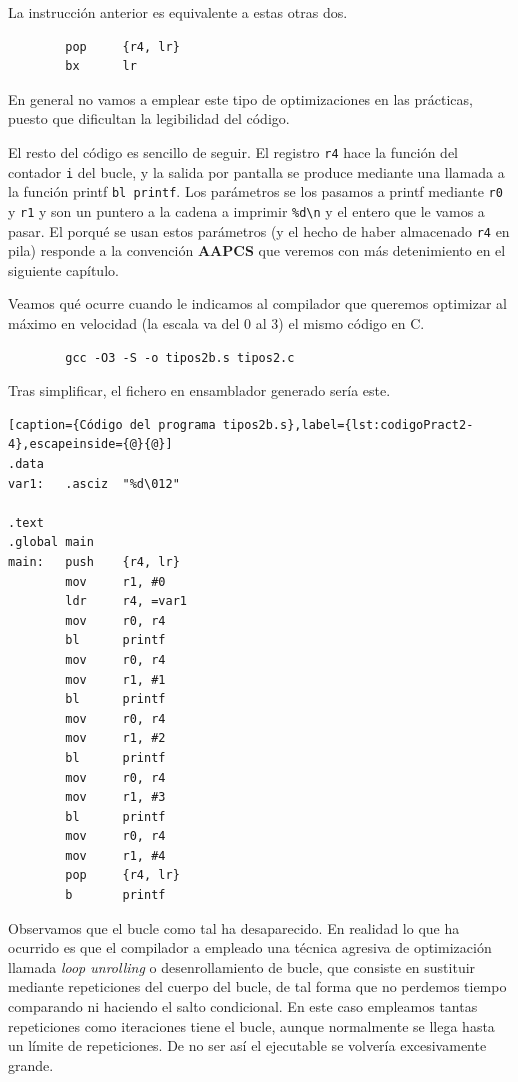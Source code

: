 La instrucción anterior es equivalente a estas otras dos.

\begin{lstlisting}
        pop     {r4, lr}
        bx      lr
\end{lstlisting}

En general no vamos a emplear este tipo de optimizaciones en las prácticas, puesto que
dificultan la legibilidad del código.

El resto del código es sencillo de seguir. El registro {\tt r4} hace la función del
contador {\tt i} del bucle, y la salida por pantalla se produce mediante una llamada
a la función printf {\tt bl printf}. Los parámetros se los pasamos a printf mediante
{\tt r0} y {\tt r1} y son un puntero a la cadena a imprimir {\tt \%d\textbackslash n}
y el entero que le vamos a pasar. El porqué se usan estos parámetros (y el hecho de
haber almacenado {\tt r4} en pila) responde a la convención {\bf AAPCS} que
veremos con más detenimiento en el siguiente capítulo.

Veamos qué ocurre cuando le indicamos al compilador que queremos optimizar al
máximo en velocidad (la escala va del 0 al 3) el mismo código en C.

\begin{lstlisting}
        gcc -O3 -S -o tipos2b.s tipos2.c
\end{lstlisting}

Tras simplificar, el fichero en ensamblador generado sería este.

\begin{lstlisting}[caption={Código del programa tipos2b.s},label={lst:codigoPract2-4},escapeinside={@}{@}]
.data
var1:   .asciz  "%d\012"

.text
.global main
main:   push    {r4, lr}
        mov     r1, #0
        ldr     r4, =var1
        mov     r0, r4
        bl      printf
        mov     r0, r4
        mov     r1, #1
        bl      printf
        mov     r0, r4
        mov     r1, #2
        bl      printf
        mov     r0, r4
        mov     r1, #3
        bl      printf
        mov     r0, r4
        mov     r1, #4
        pop     {r4, lr}
        b       printf
\end{lstlisting}

Observamos que el bucle como tal ha desaparecido. En realidad lo que ha ocurrido
es que el compilador a empleado una técnica agresiva de optimización llamada
{\it loop unrolling} o desenrollamiento de bucle, que consiste en sustituir
mediante repeticiones del cuerpo del bucle, de tal forma que no perdemos tiempo
comparando ni haciendo el salto condicional. En este caso empleamos tantas repeticiones
como iteraciones tiene el bucle, aunque normalmente se llega hasta un límite de
repeticiones. De no ser así el ejecutable se volvería excesivamente grande.

